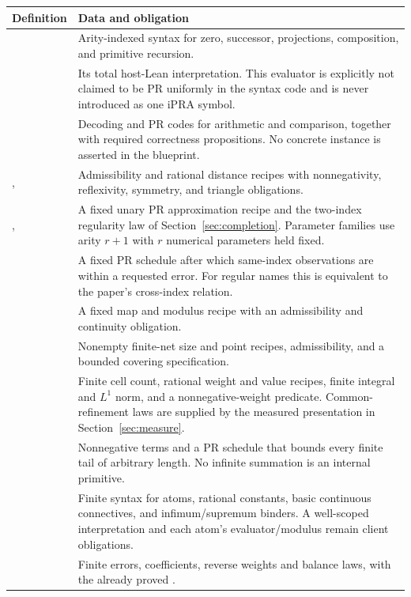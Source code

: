 \begin{longtable}{@{}P{.28\textwidth}P{.65\textwidth}@{}}
\toprule Definition & Data and obligation\\\midrule\endhead
{} & Arity-indexed syntax for zero, successor, projections, composition, and primitive recursion.\\
 & Its total host-Lean interpretation. This evaluator is explicitly not claimed to be PR uniformly in the syntax code and is never introduced as one iPRA symbol.\\
 & Decoding and PR codes for arithmetic and comparison, together with required correctness propositions. No concrete instance is asserted in the blueprint.\\
,  & Admissibility and rational distance recipes with nonnegativity, reflexivity, symmetry, and triangle obligations.\\
,  & A fixed unary PR approximation recipe and the two-index regularity law of Section~\ref{sec:completion}. Parameter families use arity $r+1$ with $r$ numerical parameters held fixed.\\
 & A fixed PR schedule after which same-index observations are within a requested error. For regular names this is equivalent to the paper's cross-index relation.\\
 & A fixed map and modulus recipe with an admissibility and continuity obligation.\\
 & Nonempty finite-net size and point recipes, admissibility, and a bounded covering specification.\\
 & Finite cell count, rational weight and value recipes, finite integral and $L^1$ norm, and a nonnegative-weight predicate. Common-refinement laws are supplied by the measured presentation in Section~\ref{sec:measure}.\\
 & Nonnegative terms and a PR schedule that bounds every finite tail of arbitrary length. No infinite summation is an internal primitive.\\
 & Finite syntax for atoms, rational constants, basic continuous connectives, and infimum/supremum binders. A well-scoped interpretation and each atom's evaluator/modulus remain client obligations.\\
 & Finite errors, coefficients, reverse weights and balance laws, with the already proved .\\
\bottomrule
\end{longtable}


